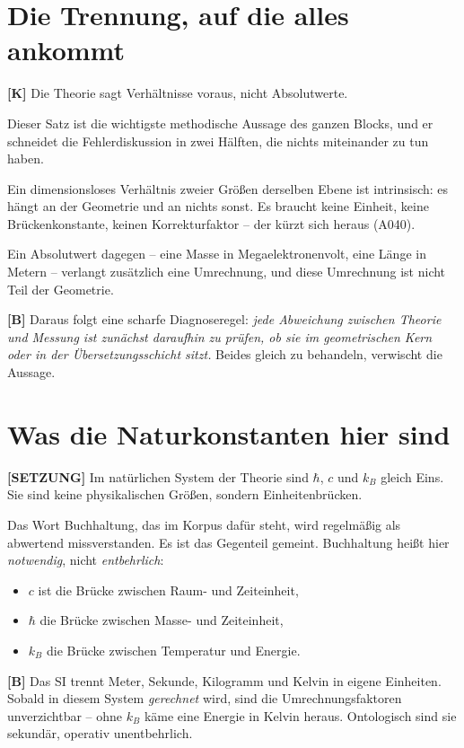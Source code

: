\section{Die Trennung, auf die alles ankommt}

\textbf{[K]} Die Theorie sagt Verhältnisse voraus, nicht Absolutwerte.

Dieser Satz ist die wichtigste methodische Aussage des ganzen Blocks, und er
schneidet die Fehlerdiskussion in zwei Hälften, die nichts miteinander zu tun
haben.

Ein dimensionsloses Verhältnis zweier Größen derselben Ebene ist intrinsisch:
es hängt an der Geometrie und an nichts sonst. Es braucht keine Einheit, keine
Brückenkonstante, keinen Korrekturfaktor -- der kürzt sich heraus (A040).

Ein Absolutwert dagegen -- eine Masse in Megaelektronenvolt, eine Länge in
Metern -- verlangt zusätzlich eine Umrechnung, und diese Umrechnung ist nicht
Teil der Geometrie.

\textbf{[B]} Daraus folgt eine scharfe Diagnoseregel: \emph{jede Abweichung
zwischen Theorie und Messung ist zunächst daraufhin zu prüfen, ob sie im
geometrischen Kern oder in der Übersetzungsschicht sitzt.} Beides gleich zu
behandeln, verwischt die Aussage.

\section{Was die Naturkonstanten hier sind}

\textbf{[SETZUNG]} Im natürlichen System der Theorie sind $\hbar$, $c$ und
$k_B$ gleich Eins. Sie sind keine physikalischen Größen, sondern
Einheitenbrücken.

Das Wort Buchhaltung, das im Korpus dafür steht, wird regelmäßig als abwertend
missverstanden. Es ist das Gegenteil gemeint. Buchhaltung heißt hier
\emph{notwendig}, nicht \emph{entbehrlich}:

\begin{itemize}
  \item $c$ ist die Brücke zwischen Raum- und Zeiteinheit,
  \item $\hbar$ die Brücke zwischen Masse- und Zeiteinheit,
  \item $k_B$ die Brücke zwischen Temperatur und Energie.
\end{itemize}

\textbf{[B]} Das SI trennt Meter, Sekunde, Kilogramm und Kelvin in eigene
Einheiten. Sobald in diesem System \emph{gerechnet} wird, sind die
Umrechnungsfaktoren unverzichtbar -- ohne $k_B$ käme eine Energie in Kelvin
heraus. Ontologisch sind sie sekundär, operativ unentbehrlich.

